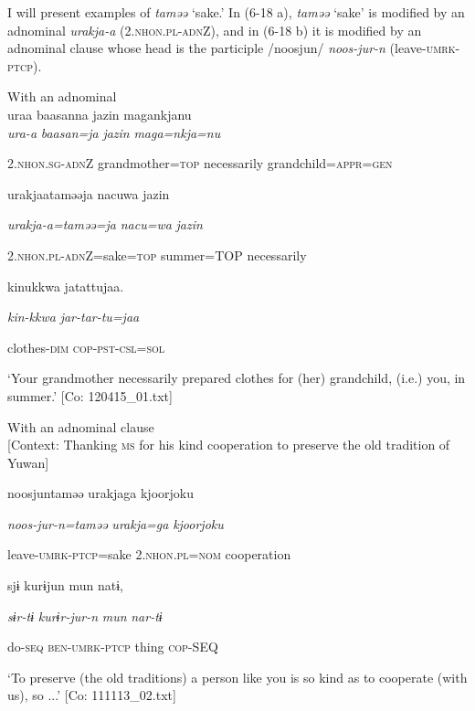 I will present examples of \textit{taməə} ‘sake.’ In (6-18 a), \textit{taməə} ‘sake’ is modified by an adnominal \textit{urakja-a} (2.\textsc{nhon}.\textsc{pl}-\textsc{adn}Z), and in (6-18 b) it is modified by an adnominal clause whose head is the participle /noosjun/ \textit{noos-jur-n} (leave-\textsc{umrk}-\textsc{ptcp}).

\ea\label{ex:6-18}
\ea With an adnominal\\
{\TM}
\gll  uraa  baasanna  jazin  magankjanu\\

      \textit{ura-a}  \textit{baasan=ja}  \textit{jazin}  \textit{maga=nkja=nu}

      2.\textsc{nhon}.\textsc{sg}-\textsc{adn}Z  grandmother=\textsc{top}  necessarily  grandchild=\textsc{appr}=\textsc{gen}

      urakjaataməəja  {\textbar}nacuwa{\textbar}  jazin

      \textit{urakja-a=taməə=ja}  \textit{nacu=wa}  \textit{jazin}

      2.\textsc{nhon}.\textsc{pl}-\textsc{adn}Z=sake=\textsc{top}  summer=TOP  necessarily

      kinukkwa  jatattujaa.

      \textit{kin-kkwa}  \textit{jar-tar-tu=jaa}

      clothes-\textsc{dim}  \textsc{cop}-\textsc{pst}-\textsc{csl}=\textsc{sol}

\glt ‘Your grandmother necessarily prepared clothes for (her) grandchild, (i.e.) you, in summer.’ [Co: 120415\_01.txt]
\z

 \ex With an adnominal clause\\{}
[Context: Thanking \textsc{ms} for his kind cooperation to preserve the old tradition of Yuwan]

{\TM}
\gll noosjuntaməə  urakjaga  {\textbar}kjoorjoku{\textbar}

      \textit{noos-jur-n=taməə}  \textit{urakja=ga}  \textit{kjoorjoku}

      leave-\textsc{umrk}-\textsc{ptcp}=sake  2.\textsc{nhon}.\textsc{pl}=\textsc{nom}  cooperation

      sjɨ  kurɨjun  mun  natɨ,

      \textit{sɨr-tɨ}  \textit{kurɨr-jur-n}  \textit{mun}  \textit{nar-tɨ}

      do-\textsc{seq}  \textsc{ben}-\textsc{umrk}-\textsc{ptcp}  thing  \textsc{cop}-SEQ

\glt ‘To preserve (the old traditions) a person like you is so kind as to cooperate (with us), so ...’ [Co: 111113\_02.txt]
\z


